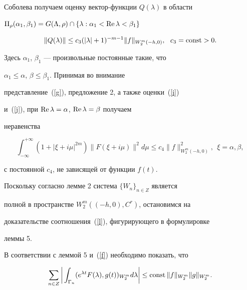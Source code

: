 Соболева получаем оценку вектор-функции $Q(\lambda)$ в области


$\Pi_\rho(\alpha_1,\beta_1)=G(\Lambda,\rho)\cap


\{\lambda:\alpha_1<\re\lambda<\beta_1\}$


\begin{equation}


\label{j}


\|Q(\lambda)\|\le c_3(|\lambda|+1)^{-m-1}\|f\|_{W_2^m(-h,0)},\ \ c_3=\const>0.


\end{equation}


Здесь $\alpha_1$, $\beta_1$ --- произвольные постоянные такие, что


$\alpha_1\le\alpha$, $\beta\le\beta_1$. Принимая во внимание


представление~(\ref{g}), предложение 2, а также оценки~(\ref{i})


и~(\ref{j}), при $\operatorname{Re}\lambda=\alpha$, $\operatorname{Re}\lambda=\beta$ получаем


неравенства


\begin{equation}


\label{k}


\int_{-\infty}^{+\infty}(1+|\xi+i\mu|^{2m})\|F(\xi+i\mu)\|^2d\mu


\le c_4\|f\|_{W_2^m(-h,0)}^2,\ \ \xi=\alpha,\beta,


\end{equation}


с постоянной $c_4$, не зависящей от функции $f(t)$.





Поскольку согласно лемме 2 система $\{W_n\}_{n\in Z}$ является


полной в пространстве $W_2^m((-h,0),C^r)$, остановимся на


доказательстве соотношения~(\ref{l}), фигурирующего в формулировке


леммы 5.





В соответствии с леммой 5 и~(\ref{f}) необходимо показать, что


\begin{equation}


\label{m}


\sum\limits_{n\in Z}\bigg|\int_{\Gamma_n}(e^{\lambda t}F(\lambda),g(t))


_{W_2^m}d\lambda\bigg|\le \const\|f\|_{W_2^m}\|g\|_{W_2^m}.


\end{equation}





